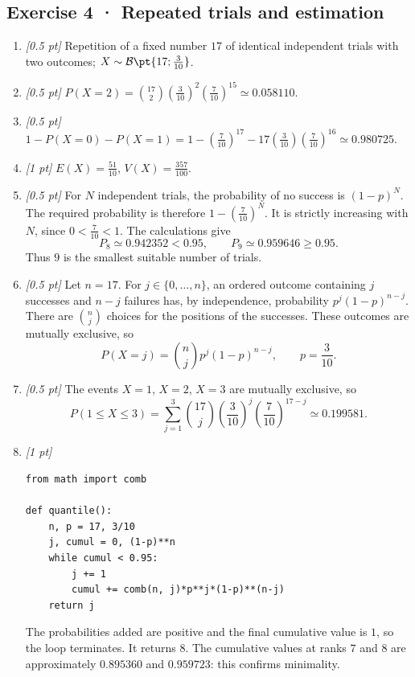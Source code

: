\subsection*{Exercise 4 · Repeated trials and estimation}\begin{enumerate}

\item \textit{[0.5 pt]} Repetition of a fixed number $17$ of identical independent trials with two outcomes; $X\sim\mathcal B\pt{17;\frac{3}{10}}$.

\item \textit{[0.5 pt]} $P(X=2)=\binom{17}2(\frac{3}{10})^2(\frac{7}{10})^{15}\simeq\num{0,058110}$.

\item \textit{[0.5 pt]} $1-P(X=0)-P(X=1)=1-(\frac{7}{10})^{17}-17(\frac{3}{10})(\frac{7}{10})^{16}\simeq\num{0,980725}$.

\item \textit{[1 pt]} $E(X)=\frac{51}{10}$, $V(X)=\frac{357}{100}$.

\item \textit{[0.5 pt]} For $N$ independent trials, the probability of no success is $(1-p)^N$. The required probability is therefore $1-(\frac{7}{10})^N$. It is strictly increasing with $N$, since $0<\frac{7}{10}<1$. The calculations give
\[P_{8}\simeq\num{0,942352}<\num{0,95},\qquad P_{9}\simeq\num{0,959646}\ge\num{0,95}.\]
Thus $9$ is the smallest suitable number of trials.

\item \textit{[0.5 pt]} Let $n=17$. For $j\in\{0,\ldots,n\}$, an ordered outcome containing $j$ successes and $n-j$ failures has, by independence, probability $p^j(1-p)^{n-j}$. There are $\binom nj$ choices for the positions of the successes. These outcomes are mutually exclusive, so
\[P(X=j)=\binom nj p^j(1-p)^{n-j},\qquad p=\frac{3}{10}.\]

\item \textit{[0.5 pt]} The events $X=1$, $X=2$, $X=3$ are mutually exclusive, so
\[P(1\le X\le3)=\sum_{j=1}^3\binom{17}j(\frac{3}{10})^j(\frac{7}{10})^{17-j}\simeq\num{0,199581}.\]


\item \textit{[1 pt]} 
\begin{lstlisting}
from math import comb

def quantile():
    n, p = 17, 3/10
    j, cumul = 0, (1-p)**n
    while cumul < 0.95:
        j += 1
        cumul += comb(n, j)*p**j*(1-p)**(n-j)
    return j
\end{lstlisting}
The probabilities added are positive and the final cumulative value is $1$, so the loop terminates. It returns $8$. The cumulative values at ranks $7$ and $8$ are approximately $\num{0,895360}$ and $\num{0,959723}$: this confirms minimality.

\end{enumerate}

